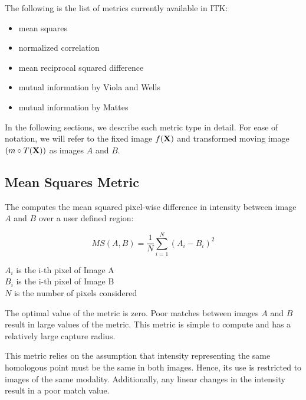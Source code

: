 The following is the list of metrics currently available in ITK:
\begin{itemize}
\item mean squares\\ 
\item normalized correlation \\ 
\item mean reciprocal squared difference \\  
\item mutual information by Viola and Wells \\ 
\item mutual information by Mattes \\ 
\end{itemize}

In the following sections, we describe each metric type in detail. 
For ease of notation, we will refer to the fixed image $f(\bf{X})$ 
and transformed moving image $(m \circ T(\bf{X}))$ as images $A$ and $B$.

\subsection{Mean Squares Metric}
\label{sec:MeanSquaresMetric}

The  computes the mean squared
pixel-wise difference in intensity between image $A$ and $B$ over a user
defined region:

\begin{equation}
MS(A,B) = \frac{1}{N} \sum_{i=1}^N \left( A_i - B_i \right)^2
\end{equation}
\begin{center}
$A_i$ is the i-th pixel of Image A\\ 
$B_i$ is the i-th pixel of Image B\\
$N$ is the number of pixels considered
\end{center}

The optimal value of the metric is zero. Poor matches between images $A$ and
$B$ result in large values of the metric. This metric is simple to compute and
has a relatively large capture radius.

This metric relies on the assumption that intensity representing the same
homologous point must be the same in both images. Hence, its use is restricted
to images of the same modality. Additionally, any linear changes in the
intensity result in a poor match value.

